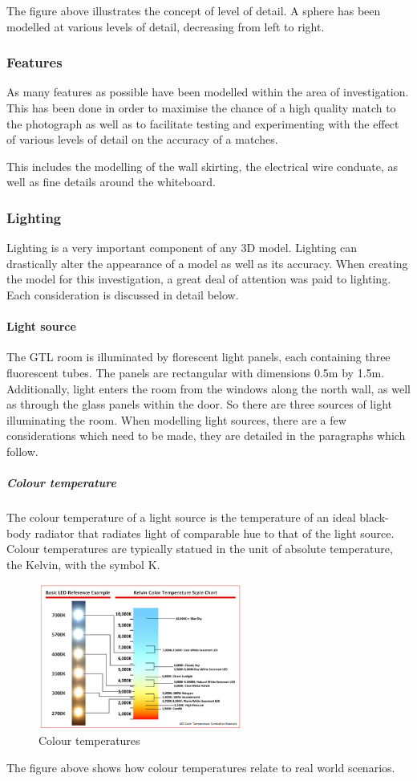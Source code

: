 \documentclass[11pt,a4paper]{report}
\begin{document}
			The figure above illustrates the concept of level of detail. A sphere has been modelled at various levels of detail, decreasing from left to right.
			
			\subsubsection{Features}
				As many features as possible have been modelled within the area of investigation. This has been done in order to maximise the chance of a high quality match to the photograph as well as to facilitate testing and experimenting with the effect of various levels of detail on the accuracy of a matches. 
				
				This includes the modelling of the wall skirting, the electrical wire conduate, as well as fine details around the whiteboard. 
				
			\subsubsection{Lighting}
				Lighting is a very important component of any 3D model. Lighting can drastically alter the appearance of a model as well as its accuracy. When creating the model for this investigation, a great deal of attention was paid to lighting. Each consideration is discussed in detail below.
				
				\paragraph{Light source}
					The GTL room is illuminated by florescent light panels, each containing three fluorescent tubes. The panels are rectangular with dimensions 0.5m by 1.5m. Additionally, light enters the room from the windows along the north wall, as well as through the glass panels within the door. So there are three sources of light illuminating the room. When modelling light sources, there are a few considerations which need to be made, they are detailed in the paragraphs which follow.
					\subparagraph{Colour temperature}
						The colour temperature of a light source is the temperature of an ideal black-body radiator that radiates light of comparable hue to that of the light source. Colour temperatures are typically statued in the unit of absolute temperature, the Kelvin, with the symbol K.
						\begin{figure}[h!]
							\centering
							\includegraphics[width=0.6\textwidth]{colour_temperature}
							\caption{Colour temperatures}
						\end{figure}
						The figure above shows how colour temperatures relate to real world scenarios.
				
\end{document}
